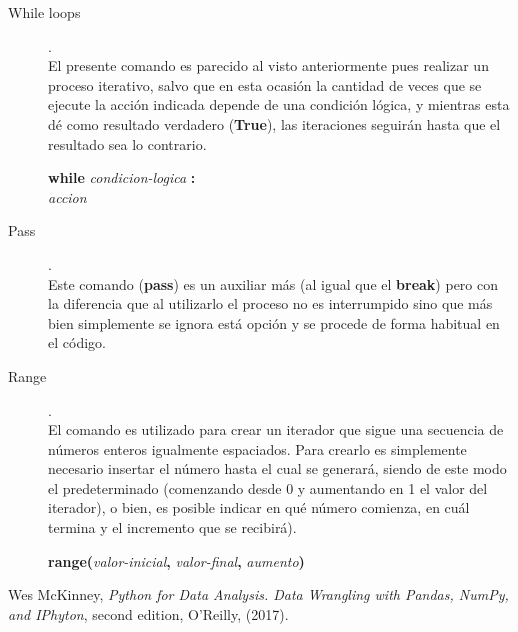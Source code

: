 \documentclass[a4paper]{article}
\begin{document}
\begin{description}
\item[While loops]. \\
El presente comando es parecido al visto anteriormente pues realizar un proceso iterativo, salvo que en esta ocasión la cantidad de veces que se ejecute la acción indicada depende de una condición lógica, y mientras esta dé como resultado verdadero (\textbf{True}), las iteraciones seguirán hasta que el resultado sea lo contrario.

\begin{center}
	\textbf{while} \textit{condicion-logica} \textbf{:} \\
	\textit{accion}
\end{center}

\item[Pass]. \\
Este comando (\textbf{pass}) es un auxiliar más (al igual que el \textbf{break}) pero con la diferencia que al utilizarlo el proceso no es interrumpido sino que más bien simplemente se ignora está opción y se procede de forma habitual en el código.

\item[Range]. \\
El comando es utilizado para crear un iterador que sigue una secuencia de números enteros igualmente espaciados. Para crearlo es simplemente necesario insertar el número hasta el cual se generará, siendo de este modo el predeterminado (comenzando desde 0 y aumentando en 1 el valor del iterador), o bien, es posible indicar en qué número comienza, en cuál termina y el incremento que se recibirá).

\begin{center}
	\textbf{range(}\textit{valor-inicial}\textbf{,} \textit{valor-final}\textbf{,} \textit{aumento}\textbf{)}
\end{center}

\end{description}

\begin{thebibliography}{1}
 Wes McKinney, \textit{Python for Data Analysis. Data Wrangling with Pandas, NumPy, and IPhyton}, second edition, O'Reilly, (2017).
\end{thebibliography}
\end{document}
